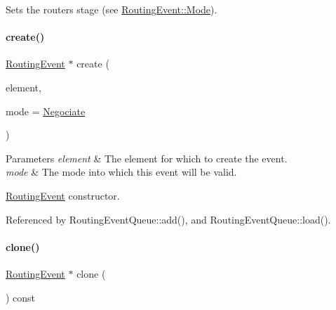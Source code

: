 Sets the router\textquotesingle{}s stage (see \hyperlink{classKite_1_1RoutingEvent_a46c8a310cf4c094f8c80e1cb8dc1f911}{Routing\+Event\+::\+Mode}). \mbox{\label{classKite_1_1RoutingEvent_a131ef83c7a57a64aed4f698c0433dffa}} 
\paragraph{\texorpdfstring{create()}{create()}}
{\footnotesize\ttfamily \hyperlink{classKite_1_1RoutingEvent}{Routing\+Event} $\ast$ create (\begin{DoxyParamCaption}\item[{\hyperlink{classKite_1_1TrackElement}{Track\+Element} $\ast$}]{element,  }\item[{unsigned int}]{mode = {\ttfamily \hyperlink{classKite_1_1RoutingEvent_a46c8a310cf4c094f8c80e1cb8dc1f911a3980b02882c46c9bd4caf15040b85d1a}{Negociate}} }\end{DoxyParamCaption})\hspace{0.3cm}{\ttfamily [static]}}


\begin{DoxyParams}{Parameters}
{\em element} & The element for which to create the event. \\
\hline
{\em mode} & The mode into which this event will be valid.\\
\hline
\end{DoxyParams}
\hyperlink{classKite_1_1RoutingEvent}{Routing\+Event} constructor. 

Referenced by Routing\+Event\+Queue\+::add(), and Routing\+Event\+Queue\+::load().

\mbox{\label{classKite_1_1RoutingEvent_ad4469c7fdb58a5f0bda8755302e37021}} 
\paragraph{\texorpdfstring{clone()}{clone()}}
{\footnotesize\ttfamily \hyperlink{classKite_1_1RoutingEvent}{Routing\+Event} $\ast$ clone (\begin{DoxyParamCaption}{ }\end{DoxyParamCaption}) const}

